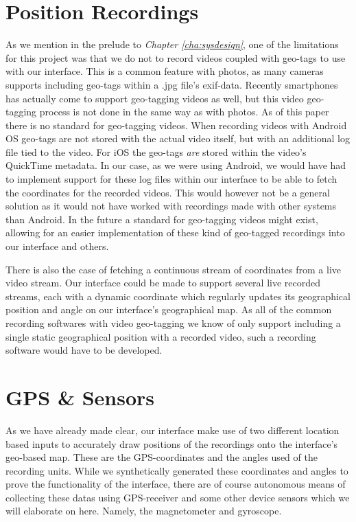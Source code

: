 \section{Position Recordings}
\label{sec:positionrecordings}
As we mention in the prelude to \textit{Chapter \ref{cha:sysdesign}}, one of the limitations for this project was that we do not to record videos coupled with geo-tags to use with our interface. This is a common feature with photos, as many cameras supports including geo-tags within a .jpg file's exif-data. Recently smartphones has actually come to support geo-tagging videos as well, but this video geo-tagging process is not done in the same way as with photos. As of this paper there is no standard for geo-tagging videos. When recording videos with Android OS geo-tags are not stored with the actual video itself, but with an additional log file tied to the video. For iOS the geo-tags \textit{are} stored within the video's QuickTime metadata. In our case, as we were using Android, we would have had to implement support for these log files within our interface to be able to fetch the coordinates for the recorded videos. This would however not be a general solution as it would not have worked with recordings made with other systems than Android. In the future a standard for geo-tagging videos might exist, allowing for an easier implementation of these kind of geo-tagged recordings into our interface and others. 

There is also the case of fetching a continuous stream of coordinates from a live video stream. Our interface could be made to support several live recorded streams, each with a dynamic coordinate which regularly updates its geographical position and angle on our interface's geographical map. As all of the common recording softwares with video geo-tagging we know of only support including a single static geographical position with a recorded video, such a recording software would have to be developed.

\section{GPS \& Sensors}
\label{sec:gpsandsensors}
As we have already made clear, our interface make use of two different location based inputs to accurately draw positions of the recordings onto the interface’s geo-based map. These are the GPS-coordinates and the angles used of the recording units. While we synthetically generated these coordinates and angles to prove the functionality of the interface, there are of course autonomous means of collecting these datas using GPS-receiver and some other device sensors which we will elaborate on here. Namely, the magnetometer and gyroscope.

